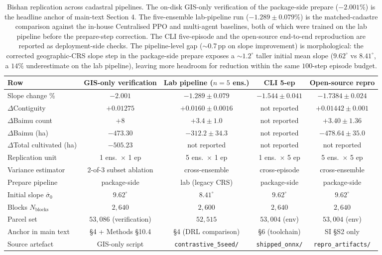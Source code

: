 \documentclass[11pt]{article}
\begin{document}
\begin{table}[htbp]
\centering
\small
\caption{Bishan replication across cadastral pipelines. The on-disk GIS-only verification of the package-side prepare ($-2.001\%$) is the headline anchor of main-text Section 4. The five-ensemble lab-pipeline run ($-1.289 \pm 0.079\%$) is the matched-cadastre comparison against the in-house Centralised PPO and multi-agent baselines, both of which were trained on the lab pipeline before the prepare-step correction. The CLI five-episode and the open-source end-to-end reproduction are reported as deployment-side checks. The pipeline-level gap ($\sim$0.7\,pp on slope improvement) is morphological: the corrected geographic-CRS slope step in the package-side prepare exposes a $\sim$$1.2^{\circ}$ taller initial mean slope ($9.62^{\circ}$ vs $8.41^{\circ}$, a $14\%$ underestimate on the lab pipeline), leaving more headroom for reduction within the same $100$-step episode budget.}
\label{tab:si-bishan-regimes}
\begin{tabular}{lcccc}
\toprule
Row & GIS-only verification & Lab pipeline ($n{=}5$ ens.) & CLI 5-ep & Open-source repro \\
\midrule
Slope change \% & $-2.001$ & $-1.289 \pm 0.079$ & $-1.544 \pm 0.041$ & $-1.7384 \pm 0.024$ \\
$\Delta$Contiguity & $+0.01275$ & $+0.0160 \pm 0.0016$ & not reported & $+0.01442 \pm 0.001$ \\
$\Delta$Baimu count & $+8$ & $+3.4 \pm 1.0$ & not reported & $+3.40 \pm 1.36$ \\
$\Delta$Baimu (ha) & $-473.30$ & $-312.2 \pm 34.3$ & not reported & $-478.64 \pm 35.0$ \\
$\Delta$Total cultivated (ha) & $-505.23$ & not reported & not reported & not reported \\
\midrule
Replication unit & 1 ens.\ $\times$ 1 ep & 5 ens.\ $\times$ 1 ep & 1 ens.\ $\times$ 5 ep & 5 ens.\ $\times$ 5 ep \\
Variance estimator & 2-of-3 subset ablation & cross-ensemble & cross-episode & cross-ensemble \\
Prepare pipeline & package-side & lab (legacy CRS) & package-side & package-side \\
Initial slope $\bar{\sigma}_0$ & $9.62^{\circ}$ & $8.41^{\circ}$ & $9.62^{\circ}$ & $9.62^{\circ}$ \\
Blocks $N_{\text{blocks}}$ & $2{,}640$ & $2{,}600$ & $2{,}640$ & $2{,}640$ \\
Parcel set & $53{,}086$ (verification) & $52{,}515$ & $53{,}004$ (env) & $53{,}004$ (env) \\
Anchor in main text & §4 + Methods §10.4 & §4 (DRL comparison) & §6 (toolchain) & SI §S2 only \\
Source artefact & GIS-only script & \texttt{contrastive\_5seed/} & \texttt{shipped\_onnx/} & \texttt{repro\_artifacts/} \\
\bottomrule
\end{tabular}
\end{table}
\end{document}
